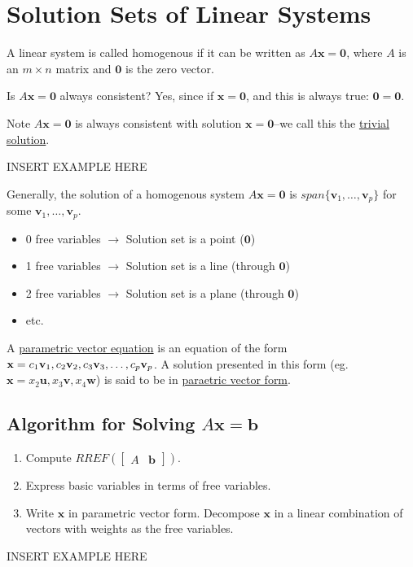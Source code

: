 \documentclass{report}
\begin{document}
\section{Solution Sets of Linear Systems}
\begin{definition}
	A linear system is called homogenous if it can be written as $A\mathbf{x}=\mathbf{0}$, where $A$ is an $m\times n$ matrix and $\mathbf{0}$ is the zero vector.
\end{definition}
Is $A\mathbf{x}=\mathbf{0}$ always consistent? Yes, since if $\mathbf{x}=\mathbf{0}$, and this is always true: $\mathbf{0}=\mathbf{0}$.
\begin{definition}
	Note $A\mathbf{x}=\mathbf{0}$ is always consistent with solution $\mathbf{x}=\mathbf{0}$--we call this the \underline{trivial solution}.
\end{definition}
\begin{example}
	INSERT EXAMPLE HERE
\end{example}
Generally, the solution of a homogenous system $A\mathbf{x}=\mathbf{0}$ is $span\{ \mathbf{v}_1, \ldots, \mathbf{v}_p\}$ for some $\mathbf{v}_1, \ldots, \mathbf{v}_p$.
\begin{itemize}
	\item 0 free variables $\rightarrow$ Solution set is a point ($\mathbf{0}$)
	\item 1 free variables $\rightarrow$ Solution set is a line (through $\mathbf{0}$)
	\item 2 free variables $\rightarrow$ Solution set is a plane (through $\mathbf{0}$)
	\item etc.
\end{itemize}
\begin{definition}
	A \underline{parametric vector equation} is an equation of the form $\mathbf{x} = c_1\mathbf{v}_1,c_2\mathbf{v}_2, \\ c_3\mathbf{v}_3, \ldots ,c_p\mathbf{v}_p$. A solution presented in this form (eg. $\mathbf{x} = x_2\mathbf{u}, x_3\mathbf{v}, x_4\mathbf{w}$) is said to be in \underline{paraetric vector form}.
\end{definition}
\subsection*{Algorithm for Solving $A\mathbf{x}=\mathbf{b}$}
\begin{enumerate}
	\item Compute $RREF(\begin{bmatrix} A & \mathbf{b} \end{bmatrix})$.
	\item Express basic variables in terms of free variables.
	\item Write $\mathbf{x}$ in parametric vector form. Decompose $\mathbf{x}$ in a linear combination of vectors with weights as the free variables.
\end{enumerate}
\begin{example}
	INSERT EXAMPLE HERE
\end{example}
\end{document}
